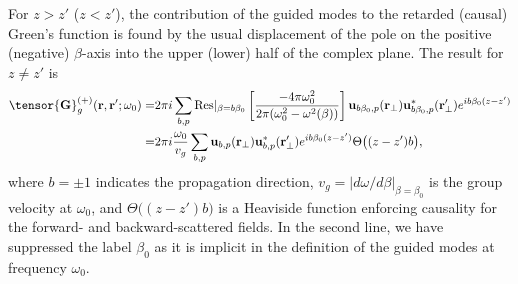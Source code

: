 \documentclass[preprint, aps,pra,onecolumn]{revtex4-1} %
\begin{document}
For $z>z'$ ($z<z'$), the contribution of the guided modes to the retarded (causal) Green's function is found by the 
usual displacement of the pole on the positive (negative) $\beta$-axis into the upper (lower) half of 
the complex plane. The result for $z \neq z'$ is \cite{manga_rao_single_2007}
	\begin{align} 
		\tensor{\mathbf{G}}^{(+)}_g(\br,\br'; \omega_0) = &2\pi i \sum_{b,p}  {\rm Res}\vert_{\beta =b\beta_0} 
\left[\frac{-4\pi \omega_0^2 }{2\pi ( \omega_0^2-\omega^2(\beta))}\right]  \mathbf{u}_{b\beta_0, p} 
(\br_\perp)\mathbf{u}^*_{b\beta_0, p} (\br_{\perp}^\prime)e^{ib \beta_0 (z-z')} \nonumber \\
= & 2\pi i \frac{\omega_0}{v_g } \sum_{b,p} \mathbf{u}_{b, p} (\br_\perp)\mathbf{u}^*_{b, p} 
(\br_{\perp}^\prime) e^{i b\beta_0(z-z')} \Theta \big( (z-z')b \big), \label{Eq::GreensGuided}
	\end{align}
where $b=\pm 1$ indicates the propagation direction, $v_g= \vert d\omega/d\beta \vert_{\beta=\beta_0}$ is the group velocity at $\omega_0$, and $\Theta \big( (z-z')b \big)$ is a Heaviside function enforcing causality for the forward- and backward-scattered fields. In the second line, we have suppressed the label $\beta_0$ as it is implicit in the definition of the guided modes at frequency $\omega_0$. 
\end{document}
